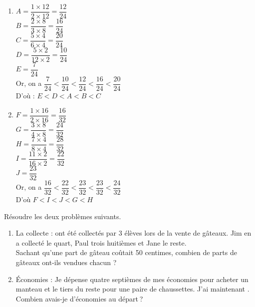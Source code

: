 \begin{colonne*exercice}
\begin{corrige}
   \ \\ [-5mm]
   \begin{enumerate}
      \item $A =\dfrac{1\times12}{2\times12} =\dfrac{12}{24}$ \\ [2mm]
         $B =\dfrac{2\times8}{3\times8} =\dfrac{16}{24}$ \\ [2mm]
         $C =\dfrac{5\times4}{6\times4} =\dfrac{20}{24}$ \\ [2mm]
         $D = \dfrac{5\times2}{12\times2} =\dfrac{10}{24}$ \\ [2mm]
         $E =\dfrac{7}{24}$ \\ [2mm]
         Or, on a $\dfrac{7}{24}<\dfrac{10}{24}<\dfrac{12}{24}<\dfrac{16}{24}<\dfrac{20}{24}$ \\ [2mm]
         D'où : {\blue $E<D<A<B<C$} \\ [2mm]
      \item $F =\dfrac{1\times16}{2\times16} =\dfrac{16}{32}$ \\ [2mm]
         $G =\dfrac{3\times8}{4\times8} =\dfrac{24}{32}$ \\ [2mm]
         $H =\dfrac{7\times4}{8\times4} =\dfrac{28}{32}$ \\ [2mm]
         $I = \dfrac{11\times2}{16\times2} =\dfrac{22}{32}$ \\ [2mm]
         $J =\dfrac{23}{32}$ \\ [2mm]
         Or, on a $\dfrac{16}{32}<\dfrac{22}{32}<\dfrac{23}{32}<\dfrac{23}{32}<\dfrac{24}{32}$ \\ [2mm]
         D'où {\blue $F<I<J<G<H$}
   \end{enumerate}
\end{corrige}

\medskip


\begin{exercice}
Résoudre les deux problèmes suivants.
   \begin{enumerate}
      \item La collecte :  ont été collectés par 3 élèves lors de la vente de gâteaux. Jim en  a collecté le quart, Paul trois huitièmes et Jane le reste. \\
         Sachant qu’une part de gâteau coûtait 50 centimes, combien de parts de gâteaux ont-ils vendues chacun ?
       \item Économies : Je dépense quatre septièmes de mes économies pour acheter un manteau et le tiers du reste pour une paire de chaussettes. J’ai maintenant . \\
          Combien avais-je d’économies au départ ?
   \end{enumerate}
\end{exercice}


\end{colonne*exercice}
